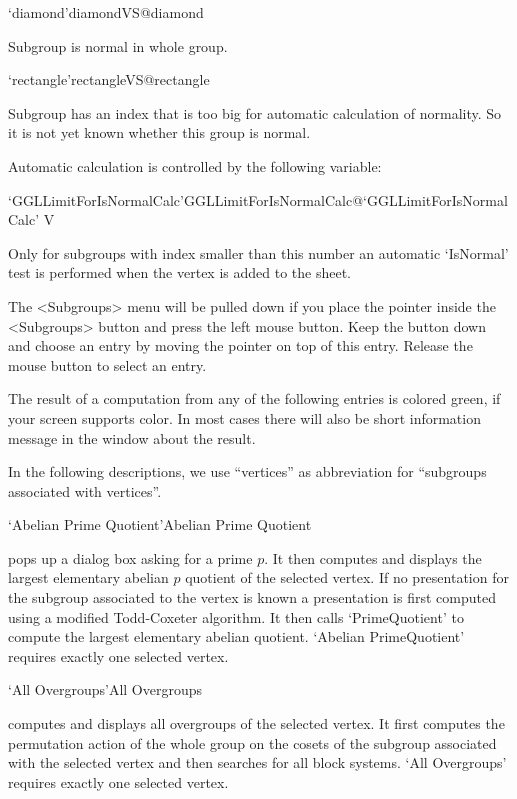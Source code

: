 \>`diamond'{diamondVS}@{diamond}

  Subgroup is normal in whole group.

\>`rectangle'{rectangleVS}@{rectangle}

  Subgroup has an index that is too big for automatic calculation of
  normality. So it is not yet known whether this group is normal.

\bigskip

Automatic calculation is controlled by the following variable:

\>`GGLLimitForIsNormalCalc'{GGLLimitForIsNormalCalc}@{`GGLLimitForIsNormalCalc'} V

  Only for subgroups with index smaller than this number an automatic
  `IsNormal' test is performed when the vertex is added to the sheet.



The <Subgroups> menu will be pulled down  if you place the pointer inside
the <Subgroups> button and press the  left mouse button.  Keep the button
down and  choose an entry by  moving  the pointer on   top of this entry.
Release the mouse button to select an entry.

The result of  a computation  from any  of  the following entries  is
colored green, if  your screen supports color.   In most cases there will
also be short information message in the {\GAP} window about the result.

In  the following descriptions, we  use ``vertices'' as abbreviation for
``subgroups associated with vertices''.

\>`Abelian Prime Quotient'{Abelian Prime Quotient}

pops  up a dialog  box asking  for a  prime  $p$.  It  then computes  and
displays the largest elementary   abelian  $p$ quotient of  the  selected
vertex.  If no presentation for the  subgroup associated to the vertex is
known   a presentation is  first computed  using  a modified Todd-Coxeter
algorithm.     It then calls    `PrimeQuotient' to   compute  the largest
elementary abelian quotient.  `Abelian PrimeQuotient' requires exactly one
selected vertex. 

\>`All Overgroups'{All Overgroups}

computes and displays all overgroups  of the selected vertex.  It  first
computes the permutation action of the whole  group on the cosets of the
subgroup associated with  the selected vertex and  then searches  for all
block systems.  `All Overgroups' requires exactly one selected vertex.

